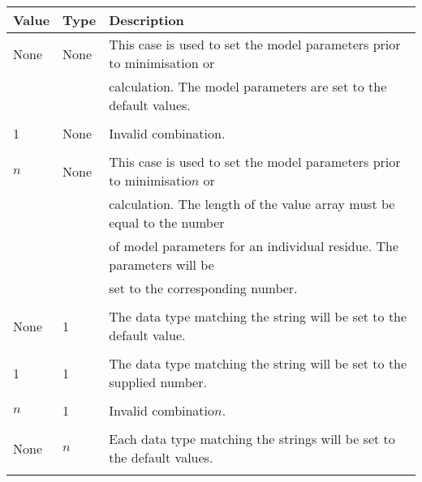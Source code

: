 \begin{center}
\begin{tabular}{lll}
\toprule

Value & Type & Description \\

\midrule

None & None & This case is used to set the model parameters prior to minimisation \index{minimisation} or \\

 &  & calculation.  The model parameters are set to the default values. \\

 &  &  \\

1 & None & Invalid combination. \\

 &  &  \\

$n$ & None & This case is used to set the model parameters prior to minimisatio$n$ or \\

 &  & calculation.  The length of the value array must be equal to the number \\

 &  & of model parameters for an individual residue.  The parameters will be \\

 &  & set to the corresponding number. \\

 &  &  \\

None & 1 & The data type matching the string will be set to the default value. \\

 &  &  \\

1 & 1 & The data type matching the string will be set to the supplied number. \\

 &  &  \\

$n$ & 1 & Invalid combinatio$n$. \\

 &  &  \\

None & $n$ & Each data type matching the strings will be set to the default values. \\

 &  &  \\


\end{tabular}
\end{center}
